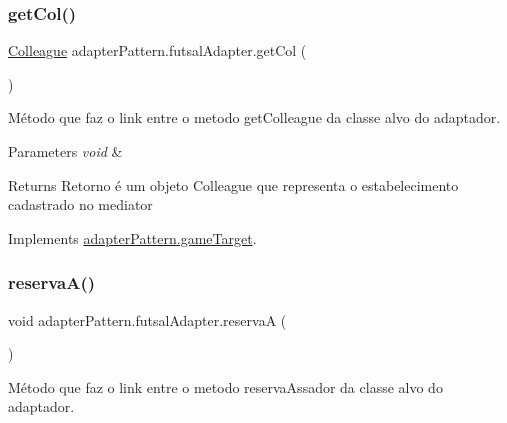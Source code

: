 \mbox{\label{classadapter_pattern_1_1futsal_adapter_adaffc04b294957e46799734741430eb4}} 
\subsubsection{\texorpdfstring{getCol()}{getCol()}}
{\footnotesize\ttfamily \mbox{\hyperlink{classmediator_pattern_1_1_colleague}{Colleague}} adapter\+Pattern.\+futsal\+Adapter.\+get\+Col (\begin{DoxyParamCaption}{ }\end{DoxyParamCaption})}



Método que faz o link entre o metodo get\+Colleague da classe alvo do adaptador. 


\begin{DoxyParams}{Parameters}
{\em void} & \\
\hline
\end{DoxyParams}
\begin{DoxyReturn}{Returns}
Retorno é um objeto Colleague que representa o estabelecimento cadastrado no mediator 
\end{DoxyReturn}


Implements \mbox{\hyperlink{interfaceadapter_pattern_1_1game_target_ad3fc8b4c4a732bcc875071ed0c081261}{adapter\+Pattern.\+game\+Target}}.

\mbox{\label{classadapter_pattern_1_1futsal_adapter_a8c447ed3eb57e8f6789219be1cba92fe}} 
\subsubsection{\texorpdfstring{reservaA()}{reservaA()}}
{\footnotesize\ttfamily void adapter\+Pattern.\+futsal\+Adapter.\+reservaA (\begin{DoxyParamCaption}{ }\end{DoxyParamCaption})}



Método que faz o link entre o metodo reserva\+Assador da classe alvo do adaptador. 


